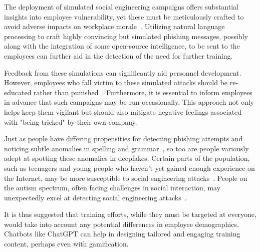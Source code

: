 The deployment of simulated social engineering campaigns offers substantial insights into employee vulnerability, yet these must be meticulously crafted to avoid adverse impacts on workplace morale~\citep{mitnick_The_Art_of_Deception_2003}. Utilizing natural language processing to craft highly convincing but simulated phishing messages, possibly along with the integration of some open-source intelligence, to be sent to the employees can further aid in the detection of the need for further training.

Feedback from these simulations can significantly aid personnel development. However, employees who fall victim to these simulated attacks should be re-educated rather than punished~\citep{mitnick_The_Art_of_Deception_2003}. Furthermore, it is essential to inform employees in advance that such campaigns may be run occasionally. This approach not only helps keep them vigilant but should also mitigate negative feelings associated with "being tricked" by their own company.

%
%
Just as people have differing propensities for detecting phishing attempts and noticing subtle anomalies in spelling and grammar~\citep{nicholson_Investigating_Teenagers_Detect_Phishing_2020, neupane_Social_Disorders_Facilitate_SE_2018}, so too are people variously adept at spotting these anomalies in deepfakes. Certain parts of the population, such as teenagers and young people who haven't yet gained enough experience on the Internet, may be more susceptible to social engineering attacks~\citep{nicholson_Investigating_Teenagers_Detect_Phishing_2020}. People on the autism spectrum, often facing challenges in social interaction, may unexpectedly excel at detecting social engineering attacks~\citep{neupane_Social_Disorders_Facilitate_SE_2018}.

It is thus suggested that training efforts, while they must be targeted at everyone, would take into account any potential differences in employee demographics. Chatbots like ChatGPT can help in designing tailored and engaging training content, perhaps even with gamification.







